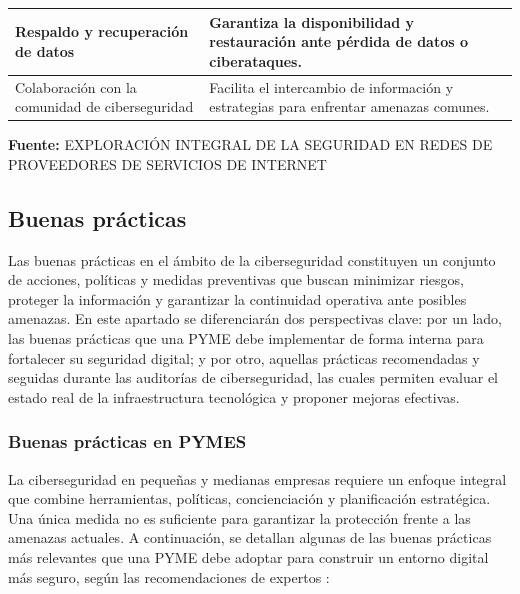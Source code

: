 \documentclass[a4paper, 11pt]{article}
\begin{document}
\begin{table}[H]
\begin{tabular}{p{4.5cm} p{10cm}}
    \bottomrule
    Respaldo y recuperación de datos & Garantiza la disponibilidad y restauración ante pérdida de datos o ciberataques. \\
    \bottomrule
    Colaboración con la comunidad de ciberseguridad & Facilita el intercambio de información y estrategias para enfrentar amenazas comunes. \\
    \bottomrule
    \end{tabular}
    \vspace{0.5em}
    \begin{flushleft}
    \footnotesize \textbf{Fuente:} EXPLORACIÓN INTEGRAL DE LA SEGURIDAD EN REDES DE PROVEEDORES DE SERVICIOS DE INTERNET \cite{mitigacion}
    \end{flushleft}
    \label{tab:medidas_mitigacion}
\end{table}

\subsection{Buenas prácticas}

Las buenas prácticas en el ámbito de la ciberseguridad constituyen un conjunto de acciones, políticas y medidas preventivas que buscan minimizar riesgos, proteger la información y garantizar la continuidad operativa ante posibles amenazas. En este apartado se diferenciarán dos perspectivas clave: por un lado, las buenas prácticas que una PYME debe implementar de forma interna para fortalecer su seguridad digital; y por otro, aquellas prácticas recomendadas y seguidas durante las auditorías de ciberseguridad, las cuales permiten evaluar el estado real de la infraestructura tecnológica y proponer mejoras efectivas.

\subsubsection{Buenas prácticas en PYMES}

La ciberseguridad en pequeñas y medianas empresas requiere un enfoque integral que combine herramientas, políticas, concienciación y planificación estratégica. Una única medida no es suficiente para garantizar la protección frente a las amenazas actuales. A continuación, se detallan algunas de las buenas prácticas más relevantes que una PYME debe adoptar para construir un entorno digital más seguro, según las recomendaciones de expertos \cite{toms2021}:
\end{document}
